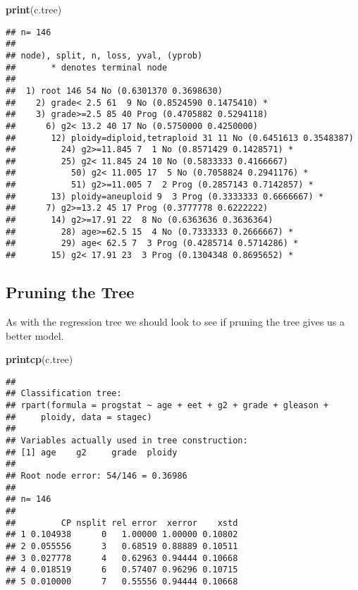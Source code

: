 \documentclass[]{article}
\newenvironment{Shaded}{\begin{snugshade}}{\end{snugshade}}
\newcommand{\KeywordTok}[1]{\textcolor[rgb]{0.13,0.29,0.53}{\textbf{#1}}}
\newcommand{\NormalTok}[1]{#1}
\begin{document}
\begin{Shaded}
\begin{Highlighting}[]
\KeywordTok{print}\NormalTok{(c.tree)}
\end{Highlighting}
\end{Shaded}

\begin{verbatim}
## n= 146 
## 
## node), split, n, loss, yval, (yprob)
##       * denotes terminal node
## 
##  1) root 146 54 No (0.6301370 0.3698630)  
##    2) grade< 2.5 61  9 No (0.8524590 0.1475410) *
##    3) grade>=2.5 85 40 Prog (0.4705882 0.5294118)  
##      6) g2< 13.2 40 17 No (0.5750000 0.4250000)  
##       12) ploidy=diploid,tetraploid 31 11 No (0.6451613 0.3548387)  
##         24) g2>=11.845 7  1 No (0.8571429 0.1428571) *
##         25) g2< 11.845 24 10 No (0.5833333 0.4166667)  
##           50) g2< 11.005 17  5 No (0.7058824 0.2941176) *
##           51) g2>=11.005 7  2 Prog (0.2857143 0.7142857) *
##       13) ploidy=aneuploid 9  3 Prog (0.3333333 0.6666667) *
##      7) g2>=13.2 45 17 Prog (0.3777778 0.6222222)  
##       14) g2>=17.91 22  8 No (0.6363636 0.3636364)  
##         28) age>=62.5 15  4 No (0.7333333 0.2666667) *
##         29) age< 62.5 7  3 Prog (0.4285714 0.5714286) *
##       15) g2< 17.91 23  3 Prog (0.1304348 0.8695652) *
\end{verbatim}

\hypertarget{pruning-the-tree}{%
\subsection{Pruning the Tree}\label{pruning-the-tree}}

As with the regression tree we should look to see if pruning the tree
gives us a better model.

\begin{Shaded}
\begin{Highlighting}[]
\KeywordTok{printcp}\NormalTok{(c.tree)}
\end{Highlighting}
\end{Shaded}

\begin{verbatim}
## 
## Classification tree:
## rpart(formula = progstat ~ age + eet + g2 + grade + gleason + 
##     ploidy, data = stagec)
## 
## Variables actually used in tree construction:
## [1] age    g2     grade  ploidy
## 
## Root node error: 54/146 = 0.36986
## 
## n= 146 
## 
##         CP nsplit rel error  xerror    xstd
## 1 0.104938      0   1.00000 1.00000 0.10802
## 2 0.055556      3   0.68519 0.88889 0.10511
## 3 0.027778      4   0.62963 0.94444 0.10668
## 4 0.018519      6   0.57407 0.96296 0.10715
## 5 0.010000      7   0.55556 0.94444 0.10668
\end{verbatim}
\end{document}
